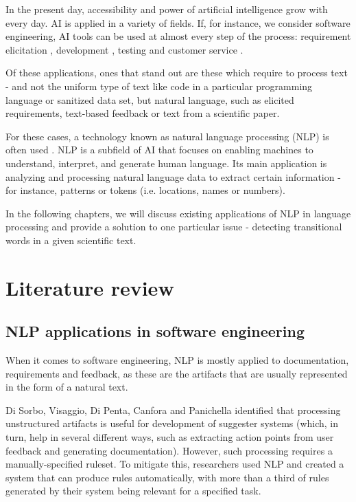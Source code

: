 \documentclass[conference]{IEEEtran}
\begin{document}
In the present day, accessibility and power of artificial intelligence grow with every day. AI is applied in a variety of fields. If, for instance, we consider software engineering, AI tools can be used at almost every step of the process: requirement elicitation \cite{intro-1}, development \cite{intro-2}, testing \cite{intro-3} and customer service \cite{intro-4}. 

Of these applications, ones that stand out are these which require to process text - and not the uniform type of text like code in a particular programming language or sanitized data set, but natural language, such as elicited requirements, text-based feedback or text from a scientific paper. 

For these cases, a technology known as natural language processing (NLP) is often used \cite{intro-5}. NLP is a subfield of AI that focuses on enabling machines to understand, interpret, and generate human language. Its main application is analyzing and processing natural language data to extract certain information - for instance, patterns or tokens (i.e. locations, names or numbers). 

In the following chapters, we will discuss existing applications of NLP in language processing and provide a solution to one particular issue - detecting transitional words in a given scientific text. 

\section{Literature review}

\subsection{NLP applications in software engineering}

When it comes to software engineering, NLP is mostly applied to documentation, requirements and feedback, as these are the artifacts that are usually represented in the form of a natural text.

Di Sorbo, Visaggio, Di Penta, Canfora and Panichella \cite{lr-1} identified that processing unstructured artifacts is useful for development of suggester systems (which, in turn, help in several different ways, such as extracting action points from user feedback and generating documentation). However, such processing requires a manually-specified ruleset. To mitigate this, researchers used NLP and created a system that can produce rules automatically, with more than a third of rules generated by their system being relevant for a specified task.
\end{document}
